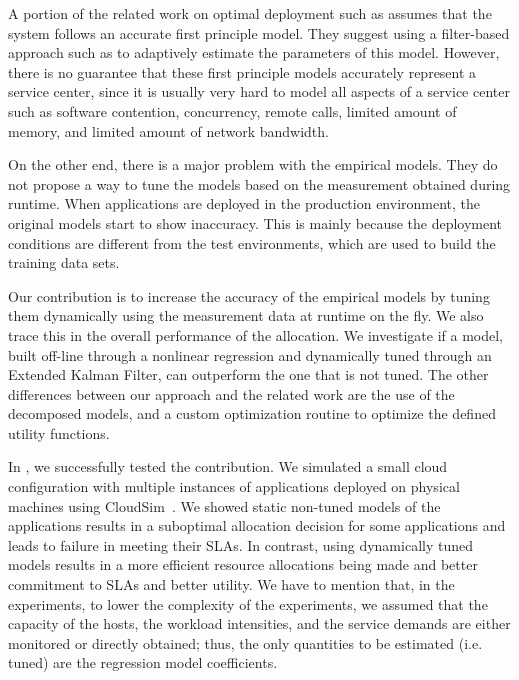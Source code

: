 \documentclass[11pt]{article}
\begin{document}
A portion of the related work on optimal deployment such as \cite{li_fast_2009,li_performance_2009} assumes that the system follows an accurate first principle model. They suggest using a filter-based approach such as \cite{zheng-integrated-2011} to adaptively estimate the parameters of this model.
However, there is no guarantee that these first principle models accurately represent a service center, since it is usually very hard to model all aspects of a service center such as software contention, concurrency, remote calls, limited amount of memory, and limited amount of network bandwidth.  

On the other end, there is a major problem with the empirical models. 
They do not propose a way to tune the models based on the measurement obtained during runtime.
When applications are deployed in the production environment, the original models start to show inaccuracy.
This is mainly because the deployment conditions are different from the test environments, which are used to build the training data sets.  
 
Our contribution is to increase the accuracy of the empirical models by tuning them dynamically using the measurement data at runtime on the fly. We also trace this in the overall performance of the allocation. We investigate if a model, built off-line through a nonlinear regression and dynamically tuned through an Extended Kalman Filter, can outperform the one that is not tuned. The other differences between our approach and the related work are the use of the decomposed models, and a custom optimization routine to optimize the defined utility functions.   

In \cite{ghanbari_feedback-based_????}, we successfully tested the contribution. We simulated
a small cloud configuration with multiple instances of applications deployed on physical machines using CloudSim~\cite{CLOUDSIM2010}.
We showed static non-tuned models of the applications results in a suboptimal allocation decision for some applications and leads to failure in meeting their SLAs. In contrast, using dynamically tuned models results in a more efficient resource allocations being made and better commitment to SLAs and better utility. 
We have to mention that, in the experiments, to lower the complexity of the experiments, we assumed that the capacity of the hosts, the workload intensities, and the service demands are either monitored or directly obtained; thus, the only quantities to be estimated (i.e. tuned) are the regression model coefficients.
\end{document}
